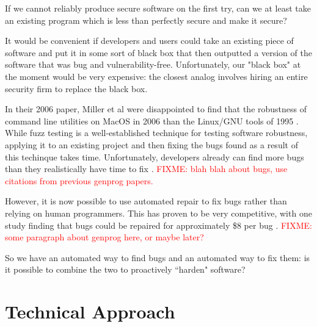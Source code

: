 \documentclass[conference]{IEEEtran}
\newcommand{\FIXME}[1]{\textcolor{red}{FIXME: #1}}
\begin{document}
If we cannot reliably produce secure software on the first try, can we at least
take an existing program which is less than perfectly secure and make it secure?

It would be convenient if developers and users could take an existing piece of
software and put it in some sort of black box that then outputted a version of
the software that was bug and vulnerability-free.  Unfortunately, our "black
box" at the moment would be very expensive: the closest analog involves hiring
an entire security firm to replace the black box.  


In their 2006 paper, Miller et al were disappointed to find that the robustness
of command line utilities on MacOS in 2006 than the Linux/GNU tools of 1995
\cite{Miller2006}.  While fuzz testing is a well-established technique for
testing software robustness, applying it to an existing project and then fixing
the bugs found as a result of this techinque takes time.  Unfortunately,
developers already can find more bugs than they realistically have time to fix
\cite{devshavetoomanybugs}.  \FIXME{blah blah about bugs, use citations from
previous genprog papers.}

However, it is now possible to use automated repair to fix bugs rather than
relying on human programmers.  This has proven to be very competitive, with one
study finding that bugs could be repaired for approximately \$8 per bug
\cite{manybugs}. \FIXME{some paragraph about genprog here, or maybe later?}

So we have an automated way to find bugs and an automated way to fix them: is it
possible to combine the two to proactively ``harden" software? 


\section{Technical Approach}
\end{document}
